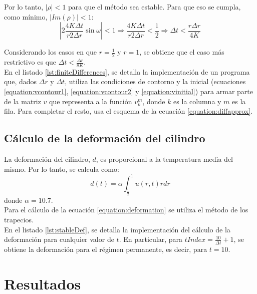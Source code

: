 \documentclass[journal, monochrome]{IEEEtran}
\begin{document}
Por lo tanto, $|\rho| < 1$ para que el método sea estable. Para que eso se cumpla, como mínimo, $|Im(\rho)| < 1$:
\begin{equation}
|2 \frac{4K\Delta t}{r 2\Delta r} \sin \omega| <1 \Rightarrow \frac{4K\Delta t}{r 2\Delta r} < \frac{1}{2} \Rightarrow \Delta t < \frac{r\Delta r}{4 K}
\end{equation}

Considerando los casos en que $r = \frac{1}{2}$ y $r = 1$, se obtiene que el caso más restrictivo es que $\Delta t < \frac{\Delta r}{8 K}$. \\

En el listado \ref{lst:finiteDifferences}, se detalla la implementación de un programa que, dados $\Delta r$ y $\Delta t$, utiliza las condiciones de contorno y la inicial (ecuaciones \eqref{equation:vcontour1}, \eqref{equation:vcontour2} y \eqref{equation:vinitial}) para armar parte de la matriz $v$ que representa a la función $v_{k}^{m}$, donde $k$ es la columna y $m$ es la fila. Para completar el resto, usa el esquema de la ecuación \eqref{equation:diffapprox}. \\



\subsection{Cálculo de la deformación del cilindro}

La deformación del cilindro, $d$, es proporcional a la temperatura media del mismo. Por lo tanto, se calcula como:
\begin{equation}
d(t) = \alpha \int_{\frac{1}{2}}^{1} u(r,t)r dr
\label{equation:deformation}
\end{equation}
donde $\alpha = 10.7$. \\

Para el cálculo de la ecuación \eqref{equation:deformation} se utiliza el método de los trapecios. \\

En el listado \ref{lst:stableDef}, se detalla la implementación del cálculo de la deformación para cualquier valor de $t$. En particular, para $tIndex = \frac{10}{\Delta t} + 1$, se obtiene la deformación para el régimen permanente, es decir, para $t = 10$.


\vspace{1cm}
\section{Resultados}
\label{section:results}
\vspace{0.5cm}
\end{document}
